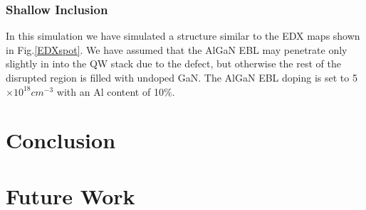 \subsubsection{Shallow Inclusion}

In this simulation we have simulated a structure similar to the EDX maps shown in Fig.\ref{EDXspot}. We have assumed that the AlGaN EBL may penetrate only slightly in into the QW stack due to the defect, but otherwise the rest of the disrupted region is filled with undoped GaN. The AlGaN EBL doping is set to 5$\times 10^{18} cm^{-3}$ with an Al content of 10$\%$.


\section{Conclusion}

\section{Future Work}

